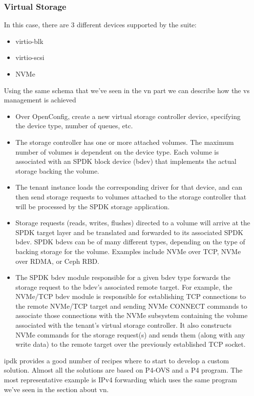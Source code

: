 \documentclass[../sn.tex]{subfiles}
\begin{document}
\subsubsection{Virtual Storage}
In this case, there are 3 different devices supported by the suite:
\begin{itemize}
    \item virtio-blk
    \item virtio-scsi
    \item NVMe
\end{itemize}
Using the same schema that we've seen in the \acrshort{vn} part we can describe how the \acrlong{vs} management is achieved
\begin{itemize}
    \item {} Over OpenConfig, create a new virtual storage controller device, specifying the device type, number of queues, etc.
    \item {} The storage controller has one or more attached volumes.
    The maximum number of volumes is dependent on the device type.
    Each volume is associated with an SPDK block device (bdev) that implements the actual storage backing the volume.
    \item {} The tenant instance loads the corresponding driver for that device, and can then send storage requests to volumes attached to the storage controller that will be processed by the SPDK storage application.
    \item {} Storage requests (reads, writes, flushes) directed to a volume will arrive at the SPDK target layer and be translated and forwarded to its associated SPDK bdev.
    SPDK bdevs can be of many different types, depending on the type of backing storage for the volume.
    Examples include NVMe over TCP, NVMe over RDMA, or Ceph RBD.
    \item {} The SPDK bdev module responsible for a given bdev type forwards the storage request to the bdev's associated remote target.
    For example, the NVMe/TCP bdev module is responsible for establishing TCP connections to the remote NVMe/TCP target and sending NVMe CONNECT commands to associate those connections with the NVMe subsystem containing the volume associated with the tenant's virtual storage controller.
    It also constructs NVMe commands for the storage request(s) and sends them (along with any write data) to the remote target over the previously established TCP socket.
\end{itemize}
\acrshort{ipdk} provides a good number of recipes where to start to develop a custom solution.
Almost all the solutions are based on P4-OVS and a P4 program.
The most representative example is IPv4 forwarding which uses the same program we've seen in the section about \acrlong{vn}\cite{ipdk-virtual-storage}.
\end{document}
